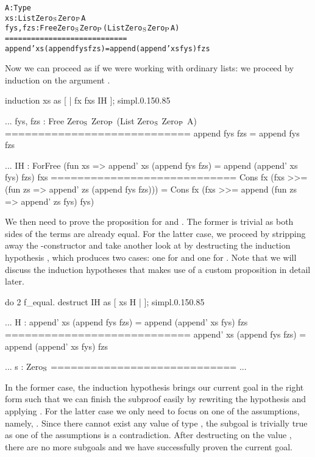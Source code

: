 \begin{alltt}
  A : Type
  xs : List Zero\(\sb{\text{S}}\) Zero\(\sb{\text{P}}\) A
  fys, fzs : Free Zero\(\sb{\text{S}}\) Zero\(\sb{\text{P}}\) (List Zero\(\sb{\text{S}}\) Zero\(\sb{\text{P}}\) A)
  ============================
  append' xs (append fys fzs) = append (append' xs fys) fzs
\end{alltt}

Now we can proceed as if we were working with ordinary lists: we proceed by induction on the  argument .

\begin{cproof1}{induction xs as [ | fx fxs IH ]; simpl.}{0.15}{0.85}
  
  ...
  fys, fzs : Free Zero\(\sb{\text{S}}\) Zero\(\sb{\text{P}}\) (List Zero\(\sb{\text{S}}\) Zero\(\sb{\text{P}}\) A)
  ============================
  append fys fzs = append fys fzs

  ...
  IH : ForFree (fun xs => append' xs (append fys fzs)
                        = append (append' xs fys) fzs) fxs
  ============================
  Cons fx (fxs >>= (fun zs => append' zs (append fys fzs))) =
  Cons fx (fxs >>= append (fun zs => append' zs fys) fys)
\end{cproof1}

We then need to prove the proposition for  and .
The former is trivial as both sides of the terms are already equal.
For the latter case, we proceed by stripping away the \--constructor and take another look at  by destructing the induction hypothesis , which produces two cases: one for  and one for .
Note that we will discuss the induction hypotheses  that makes use of a custom proposition  in detail later.

\begin{cproof1}{do 2 f_equal. destruct IH as [ xs H | ]; simpl.}{0.15}{0.85}
  
  ...
  H : append' xs (append fys fzs) = append (append' xs fys) fzs
  ============================
  append' xs (append fys fzs) = append (append' xs fys) fzs

  ...
  s : Zero\(\sb{\text{S}}\)
  ============================
  ...
\end{cproof1}

In the former case, the induction hypothesis brings our current goal in the right form such that we can finish the subproof easily by rewriting the hypothesis  and applying .
For the latter case we only need to focus on one of the assumptions, namely, .
Since there cannot exist any value of type , the subgoal is trivially true as one of the assumptions is a contradiction.
After destructing on the value , there are no more subgoals and we have successfully proven the current goal.

